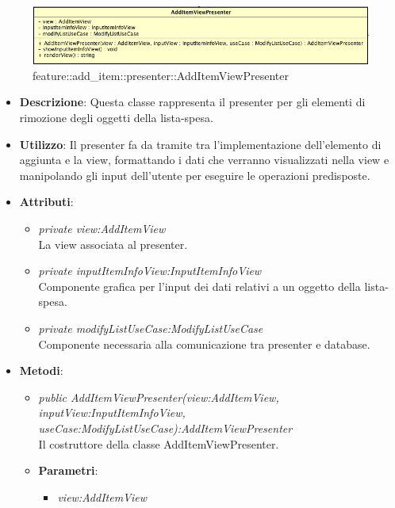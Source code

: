\label{feature::add_item::presenter::AddItemViewPresenter}
\begin{figure}[ht]
	\centering
	\includegraphics[scale=0.5]{Sezioni/SottosezioniST/img/app/AddItemViewPresenter.png}
	\caption{feature::add\_item::presenter::AddItemViewPresenter}
\end{figure}

\begin{itemize}
\item \textbf{Descrizione}: Questa classe rappresenta il presenter per gli elementi di rimozione degli oggetti  della lista-spesa.
\item \textbf{Utilizzo}: Il presenter fa da tramite tra l'implementazione dell'elemento di aggiunta e la view, formattando i dati che verranno visualizzati nella view e manipolando gli input dell'utente per eseguire le operazioni predisposte.
\item \textbf{Attributi}: 
	\begin{itemize}
	\item \textit{private view:AddItemView}\\
	La view associata al presenter.
	\item \textit{private inputItemInfoView:InputItemInfoView}\\
	Componente grafica per l'input dei dati relativi a un oggetto della lista-spesa.
	\item \textit{private modifyListUseCase:ModifyListUseCase}\\
	Componente necessaria alla comunicazione tra presenter e database.
	\end{itemize}
\item \textbf{Metodi}:
	\begin{itemize}
	\item \textit{public AddItemViewPresenter(view:AddItemView, inputView:InputItemInfoView, \\ useCase:ModifyListUseCase):AddItemViewPresenter}\\
	Il costruttore della classe AddItemViewPresenter.	
		\item{\textbf{Parametri}: \begin{itemize}
		\item \textit{view:AddItemView}\\

\end{itemize}}
\end{itemize}
\end{itemize}
